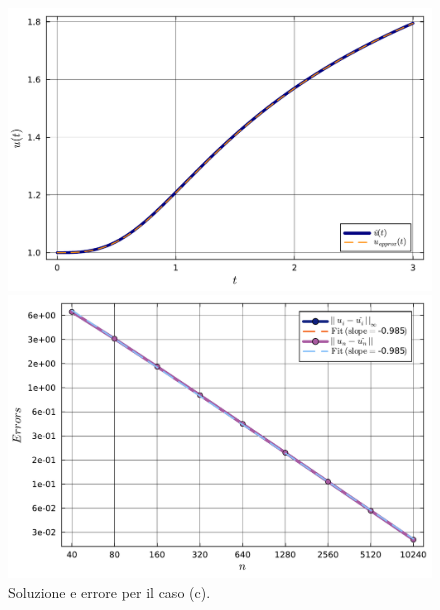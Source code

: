 \documentclass[letterpaper, 12pt]{article}
\begin{document}
\begin{figure}[!ht]
    \centering
    \begin{minipage}[b]{0.47\textwidth}
        \includegraphics[width=\textwidth]{6225.pdf}
    \end{minipage}
    \hspace{0.5cm}
    \begin{minipage}[b]{0.47\textwidth}
        \includegraphics[width=\textwidth]{6226.pdf}
    \end{minipage}
    \caption{Soluzione e errore per il caso (c).}
    \label{fig:es6_2_1_3}
\end{figure}
\end{document}
